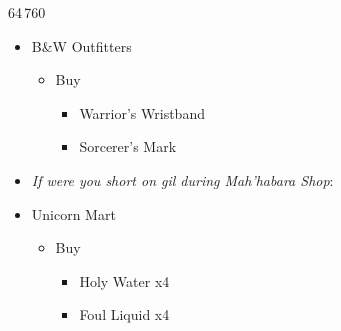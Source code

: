 \begin{multicols}{2}
\begin{shop}{64\,760}
\begin{itemize}
\begin{itemize}
\begin{itemize}
        \end{itemize}
    \end{itemize}
    \item B\&W Outfitters
    \begin{itemize}
        \item Buy
        \begin{itemize}
            \item Warrior's Wristband
            \item Sorcerer's Mark
        \end{itemize}
    \end{itemize}
    \item \textit{If were you short on gil during Mah'habara Shop}:
    \item Unicorn Mart
    \begin{itemize}
        \item Buy
        \begin{itemize}
            \item Holy Water x4
            \item Foul Liquid x4
        \end{itemize}
    \end{itemize}
\end{itemize}
\end{shop}


\end{multicols}
